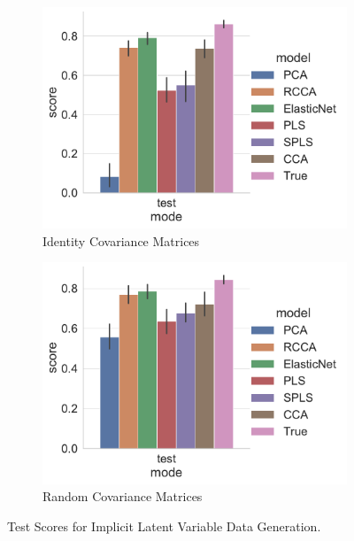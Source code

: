 \begin{figure}
\centering
\begin{subfigure}{0.49\linewidth}
\centering
\includegraphics[width=\linewidth]{figures/simulated/low/Train_Test_Scores_Identity_Covariance_implicit}
\caption{Identity Covariance Matrices}
\end{subfigure}
%
\begin{subfigure}{0.49\linewidth}
\centering
\includegraphics[width=\linewidth]{figures/simulated/low/Train_Test_Scores_Random_Covariance_implicit}
\caption{Random Covariance Matrices}
\end{subfigure}
\caption{Test Scores for Implicit Latent Variable Data Generation.}\label{fig:joint-scores}
\end{figure}

